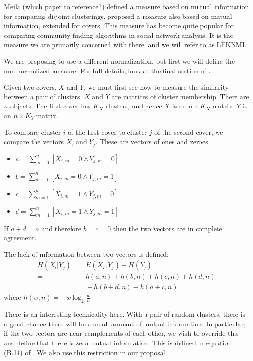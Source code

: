 \documentclass[9pt,technote]{IEEEtran}
\begin{document}
Meila (which paper to reference?) defined a measure based on mutual information for comparing disjoint clusterings.
\citet{lancichinetti-2009} proposed a measure also based on mutual information, extended for covers.
This measure has become quite popular for comparing community finding algorithms in social network analysis.
It is the measure we are primarily concerned with there, and we will refer to as LFKNMI.

We are proposing to use a different normalization, but first we will define the non-normalized measure.
For full details, look at the final section of \citet{lancichinetti-2009}.

Given two covers, $X$ and $Y$, we must first see how to measure the similarity between a pair of clusters.
$X$ and $Y$ are matrices of cluster membership. There are $n$ objects.
The first cover has $K_X$ clusters, and hence $X$ is an
$n \times K_X$ matrix. $Y$ is an $n \times K_Y$ matrix.

To compare cluster $i$ of the first cover to cluster $j$ of the second cover, we compare the vectors
$X_i$ and $Y_j$. These are vectors of ones and zeroes.

\begin{itemize}
	\item $              { a = \sum_{m=1}^n [X_{i,m} = 0 \wedge  Y_{j,m} = 0] } $
	\item $              { b = \sum_{m=1}^n [X_{i,m} = 0 \wedge  Y_{j,m} = 1] } $
	\item $              { c = \sum_{m=1}^n [X_{i,m} = 1 \wedge  Y_{j,m} = 0] } $
	\item $              { d = \sum_{m=1}^n [X_{i,m} = 1 \wedge  Y_{j,m} = 1] } $
\end{itemize}

If $a+d = n$ and therefore $b=c=0$ then the two vectors are in complete agreement.

The lack of information between two vectors is defined:
\begin{align}
	H(X_i | Y_j) = & {} H(X_i , Y_j) - H(Y_j)  \\
	               = & {} h(a,n) + h(b,n) + h(c,n) + h(d,n)  \\ 
		         & {} - h(b+d,n) - h(a+c,n)
\end{align}
where $h(w,n) = -w \log_2 \frac{w}{n} $

There is an interesting technicality here. With a pair of random clusters, there is a good chance
there will be a small amount of mutual information. In particular, if the two
vectors are near complements of each other, we wish to override this and define that
there is zero mutual information. This is defined in equation (B.14) of \cite{lancichinetti-2009}.
We also use this restriction in our proposal.
\end{document}
